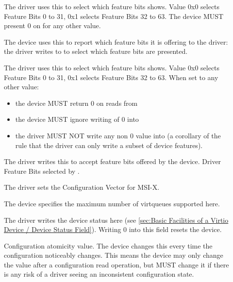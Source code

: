 \begin{description}
\item[]
        The driver uses this to select which feature bits  shows.
        Value 0x0 selects Feature Bits 0 to 31, 0x1 selects Feature Bits 32 to 63.
        The device MUST present 0 on  for any other value.

\item[]
        The device uses this to report which feature bits it is
        offering to the driver: the driver writes to
         to select which feature bits are presented.

\item[]
        The driver uses this to select which feature bits  shows.
        Value 0x0 selects Feature Bits 0 to 31, 0x1 selects Feature Bits 32 to 63.
        When set to any other value:
	\begin{itemize}
	\item the device MUST return 0 on reads from 
	\item the device MUST ignore writing of 0 into 
	\item the driver MUST NOT write any non 0 value into  (a corollary of
        the rule that the driver can only write a subset of device features).
	\end{itemize}

\item[]
        The driver writes this to accept feature bits offered by the device.
        Driver Feature Bits selected by .

\item[]
        The driver sets the Configuration Vector for MSI-X.

\item[]
        The device specifies the maximum number of virtqueues supported here.

\item[]
        The driver writes the device status here (see \ref{sec:Basic Facilities of a Virtio Device / Device Status Field}). Writing 0 into this
        field resets the device.

\item[]
        Configuration atomicity value.  The device changes this every time the
        configuration noticeably changes.  This means the device may
        only change the value after a configuration read operation,
        but MUST change it if there is any risk of a driver seeing an
        inconsistent configuration state.


\end{description}
